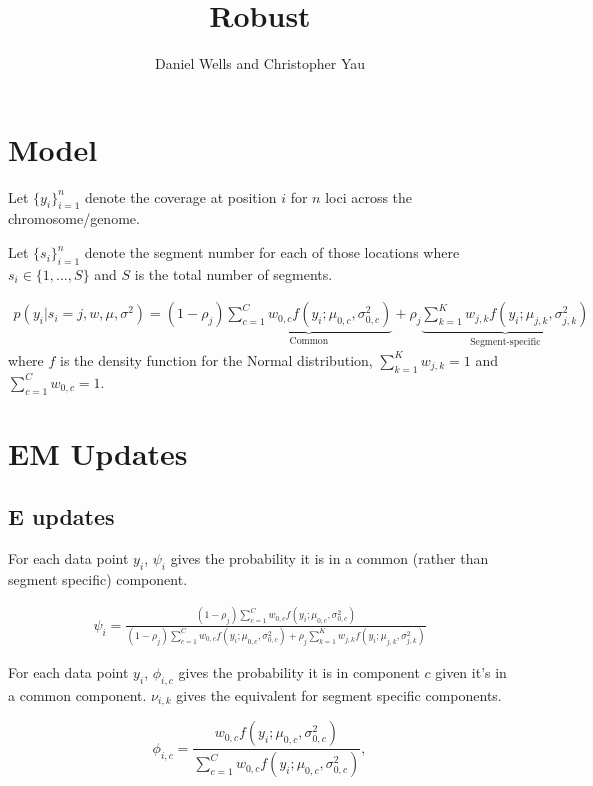 \documentclass[11pt,a4paper]{article}
\author{Daniel Wells and Christopher Yau}
\title{Robust }
\begin{document}
	\maketitle
	
\section{Model}	
	
Let $\{ y_i \}_{i=1}^n$ denote the coverage at position $i$ for $n$ loci across the chromosome/genome.

\noindent Let $\{ s_i \}_{i=1}^n$ denote the segment number for each of those locations where $s_i \in \{ 1, \dots, S \}$ and $S$ is the total number of segments.

\begin{align}
	p(y_i | s_i = j, w, \mu, \sigma^2 ) = 
    (1-\rho_{j}) \underbrace{\sum_{c=1}^{C} w_{0,c} f( y_i; \mu_{0,c}, \sigma_{0,c}^2 )}_{\text{Common}} + 
    \rho_{j} \underbrace{ \sum_{k=1}^{K} w_{j,k} f( y_i; \mu_{j,k}, \sigma_{j,k}^2 ) }_{\text{Segment-specific}}
\end{align}
where $f$ is the density function for the Normal distribution, $\sum_{k=1}^K w_{j,k} = 1$ and $\sum_{c=1}^{C} w_{0,c} = 1$.

\section{EM Updates}

\subsection{E updates}

\noindent For each data point $y_i$, $\psi_{i}$ gives the probability it is in a common (rather than segment specific) component.

\begin{align}
	\psi_{i} = \frac{ (1-\rho_{j}) \sum_{c=1}^{C} w_{0,c} f( y_i; \mu_{0,c}, \sigma_{0,c}^2 ) }
					{ (1-\rho_{j}) \sum_{c=1}^{C} w_{0,c} f( y_i; \mu_{0,c}, \sigma_{0,c}^2 ) + 
						\rho_{j} \sum_{k=1}^{K} w_{j,k} f( y_i; \mu_{j,k}, \sigma_{j,k}^2 ) }
\end{align}


\noindent For each data point $y_i$, $\phi_{i,c}$ gives the probability it is in component $c$ given it's in a common component. $\nu_{i,k}$ gives the equivalent for segment specific components.

$$
	\phi_{i,c} = \frac{ w_{0,c} f(y_i;\mu_{0, c}, \sigma_{0,c}^2 ) }
					{ \sum_{c=1}^{C} w_{0,c} f(y_i;\mu_{0,c}, \sigma_{0,c}^2 ) }  ,
$$
\end{document}

